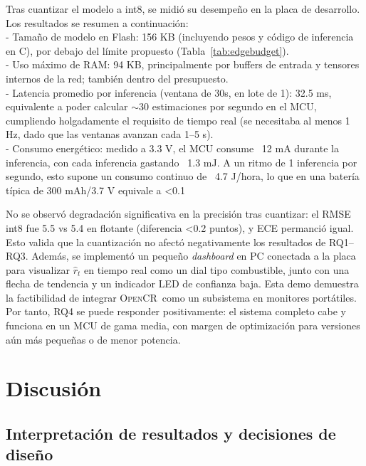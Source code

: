 \documentclass[10pt,a4paper,twocolumn]{article}
\newcommand{\OpenCR}{\textsc{OpenCR}}
\begin{document}
Tras cuantizar el modelo a int8, se midi\'o su desempe\~no en la placa de desarrollo. Los resultados se resumen a continuaci\'on:  \\
- Tama\~no de modelo en Flash: 156 KB (incluyendo pesos y c\'odigo de inferencia en C), por debajo del l\'imite propuesto (Tabla~\ref{tab:edgebudget}).  \\
- Uso m\'aximo de RAM: 94 KB, principalmente por buffers de entrada y tensores internos de la red; tambi\'en dentro del presupuesto.  \\
- Latencia promedio por inferencia (ventana de 30s, en lote de 1): 32.5 ms, equivalente a poder calcular $\sim$30 estimaciones por segundo en el MCU, cumpliendo holgadamente el requisito de tiempo real (se necesitaba al menos 1 Hz, dado que las ventanas avanzan cada 1--5 s).  \\
- Consumo energ\'etico: medido a 3.3 V, el MCU consume ~12 mA durante la inferencia, con cada inferencia gastando ~1.3 mJ. A un ritmo de 1 inferencia por segundo, esto supone un consumo continuo de ~4.7 J/hora, lo que en una bater\'ia t\'ipica de 300 mAh/3.7 V equivale a <0.1%

No se observ\'o degradaci\'on significativa en la precisi\'on tras cuantizar: el RMSE int8 fue 5.5 vs 5.4 en flotante (diferencia <0.2 puntos), y ECE permanci\'o igual. Esto valida que la cuantizaci\'on no afect\'o negativamente los resultados de RQ1--RQ3. Adem\'as, se implement\'o un peque\~no \emph{dashboard} en PC conectada a la placa para visualizar $\hat r_t$ en tiempo real como un dial tipo combustible, junto con una flecha de tendencia y un indicador LED de confianza baja. Esta demo demuestra la factibilidad de integrar \OpenCR\ como un subsistema en monitores port\'atiles. Por tanto, RQ4 se puede responder positivamente: el sistema completo cabe y funciona en un MCU de gama media, con margen de optimizaci\'on para versiones a\'un m\'as peque\~nas o de menor potencia.
\section{Discusi\'on}

\subsection{Interpretaci\'on de resultados y decisiones de dise\~no}
\end{document}
